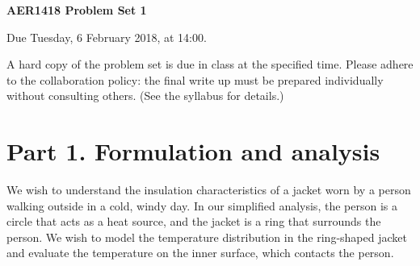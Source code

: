\documentclass[preprint,11pt]{article}
\begin{document}
\noindent\begin{Large}\textbf{AER1418 Problem Set 1}\end{Large} \hfill Due Tuesday, 6 February 2018, at 14:00.

\vspace{1em}
\noindent A hard copy of the problem set is due in class at the specified time.  %
Please adhere to the collaboration policy: the final write up must be prepared individually without consulting others. (See the syllabus for details.)

\section*{Part 1. Formulation and analysis}
We wish to understand the insulation characteristics of a jacket worn by a person walking outside in a cold, windy day.  In our simplified analysis, the person is a circle that acts as a heat source, and the jacket is a ring that surrounds the person. We wish to model the temperature distribution in the ring-shaped jacket and evaluate the temperature on the inner surface, which contacts the person.
\end{document}
